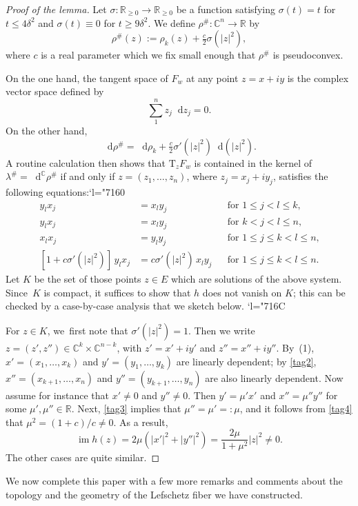\documentclass[10pt]{amsart}
\newcommand{\Changel}{\mathcode`l="7160}
\newcommand{\Changelback}{\mathcode`l="716C}
\newcommand{\C}{{\mathbb C}}
\newcommand{\R}{{\mathbb R}}
\newcommand{\im}{\operatorname{im}}
\newcommand{\etc}{,\ldots,}
\newcommand{\rT}{\mathrm{T}}
\renewcommand{\d}{\mathop{}\!\mathrm d}
\newcommand{\dc}{\d^{\scriptscriptstyle{\C}}}
\newcommand{\drho}{\d\rho}
\newcommand{\dz}{\d z}
\newcommand{\de}{\mathrel{:=}}
\let\on\colon
\theoremstyle{plain}
\theoremstyle{definition}
\begin{document}
\begin{proof}[Proof of the lemma]
Let $\sigma \on \R_{\ge0} \to \R_{\ge0}$ be a function satisfying $\sigma(t) =
t$ for $t \le 4\delta^2$ and $\sigma(t) \equiv 0$ for $t \ge 9\delta^2$.
We define $\rho^\# \on \C^n \to \R$ by
\[
\rho^\#(z) \de \rho_k(z) + \tfrac c2 \sigma(|z|^2),
\]
where $c$ is a real parameter which we fix small enough that $\rho^\#$ is
pseudoconvex.

On the one hand, the tangent space of $F_w$ at any point $z = x+iy$ is the
complex vector space defined by
\[
\sum_1^n z_j \dz_j = 0.
\]
On the other hand,
\[
\drho^\# = \drho_k + \tfrac c2 \sigma'(|z|^2) \d(|z|^2).
\]
A routine calculation then shows that $\rT_zF_w$ is contained in the kernel of
$\lambda^\# = \dc\rho^\#$ if and only if $z = (z_1 \etc z_n)$, where $z_j = x_j
+ iy_j$, satisfies the following equations:\Changel
\begin{align*}
 y_lx_j &= x_ly_j && \text{for $1 \le j < l \le k$,} \tag{1}\label{tag1} \\
 y_lx_j &= x_ly_j && \text{for $k < j < l \le n$,} \tag{2}\label{tag2} \\
 x_lx_j &= y_ly_j && \text{for $1 \le j \le k < l \le n$,} \tag{3}\label{tag3} \\
 [1+c\sigma'(|z|^2)]\, y_lx_j &= c \sigma'(|z|^2)\, x_ly_j &&
 \text{for $1 \le j \le k < l \le n$.} \tag{4}\label{tag4}
\end{align*}
Let $K$ be the set of those points $z \in E$ which are solutions of the above
system. Since~$K$ is compact, it suffices to show that $h$ does not vanish on
$K$; this can be checked by a case-by-case analysis that we sketch below.
\Changelback

For $z \in K$, we~first note that $\sigma'(|z|^2) = 1$. Then we write $z = (z',
z'') \in \C^k \times \C^{n-k}$, with $z' = x'+iy'$ and $z'' = x''+iy''$. By~(1),
$x' = (x_1 \etc x_k)$ and $y' = (y_1 \etc y_k)$ are linearly dependent; by \eqref{tag2},
$x'' = (x_{k+1} \etc x_n)$ and $y'' = (y_{k+1} \etc y_n)$ are also linearly
dependent. Now assume for instance that $x' \ne 0$ and $y'' \ne 0$. Then $y' =
\mu' x'$ and $x'' = \mu'' y''$ for some $\mu', \mu'' \in \R$. Next, \eqref{tag3} implies
that $\mu'' = \mu' \mathrel{=:} \mu$, and it follows from \eqref{tag4} that $\mu^2 =
(1+c)/c \ne 0$. As a result,
\[
\im h(z) = 2\mu (|x'|^2 + |y''|^2)
 = \frac{ 2\mu }{ 1+\mu^2 } |z|^2 \ne 0.
\]
The other cases are quite similar.
\end{proof}

We now complete this paper with a few more remarks and comments about the
topology and the geometry of the Lefschetz fiber we have constructed.
\end{document}

